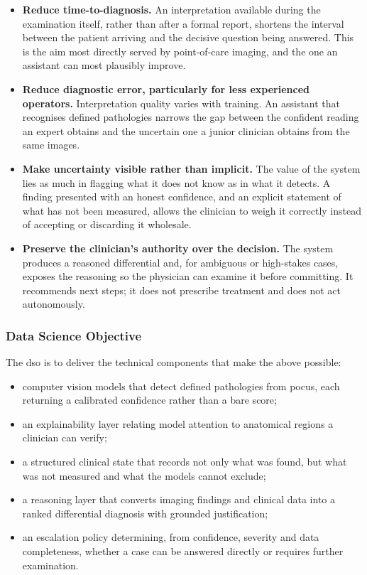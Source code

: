 \begin{itemize}[label=$\bullet$]
  \setlength\itemsep{0.3em}
  \item \textbf{Reduce time-to-diagnosis.} An interpretation available during the
    examination itself, rather than after a formal report, shortens the interval between
    the patient arriving and the decisive question being answered. This is the aim most
    directly served by point-of-care imaging, and the one an assistant can most plausibly
    improve.
  \item \textbf{Reduce diagnostic error, particularly for less experienced operators.}
    Interpretation quality varies with training. An assistant that recognises defined
    pathologies narrows the gap between the confident reading an expert obtains and the
    uncertain one a junior clinician obtains from the same images.
  \item \textbf{Make uncertainty visible rather than implicit.} The value of the system
    lies as much in flagging what it does not know as in what it detects. A finding
    presented with an honest confidence, and an explicit statement of what has not been
    measured, allows the clinician to weigh it correctly instead of accepting or
    discarding it wholesale.
  \item \textbf{Preserve the clinician's authority over the decision.} The system produces
    a reasoned differential and, for ambiguous or high-stakes cases, exposes the reasoning
    so the physician can examine it before committing. It recommends next steps; it does
    not prescribe treatment and does not act autonomously.
\end{itemize}

\subsubsection{Data Science Objective}

The \gls{dso} is to deliver the technical components that make the above possible:

\begin{itemize}[label=$\bullet$]
  \setlength\itemsep{-0.2em}
  \item computer vision models that detect defined pathologies from \gls{pocus}, each
    returning a calibrated confidence rather than a bare score;
  \item an explainability layer relating model attention to anatomical regions a clinician
    can verify;
  \item a structured clinical state that records not only what was found, but what was not
    measured and what the models cannot exclude;
  \item a reasoning layer that converts imaging findings and clinical data into a ranked
    differential diagnosis with grounded justification;
  \item an escalation policy determining, from confidence, severity and data completeness,
    whether a case can be answered directly or requires further examination.
\end{itemize}


